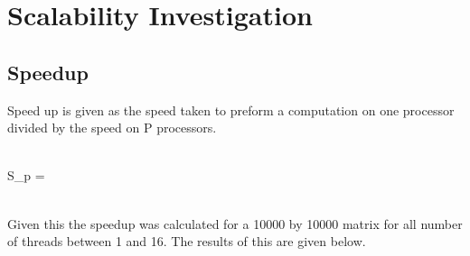 \documentclass{article}
\begin{document}
\section{Scalability Investigation}
\subsection{Speedup}
Speed up is given as the speed taken to preform a computation on one processor
divided by the speed on P processors.\\~\\
\begin{center}
S_p = \\~\\
\end{center}
Given this the speedup was calculated for a 10000 by 10000 matrix for all number
of threads between 1 and 16. The results of this are given below.\\~\\
\begin{center}
\end{center}
\end{document}
